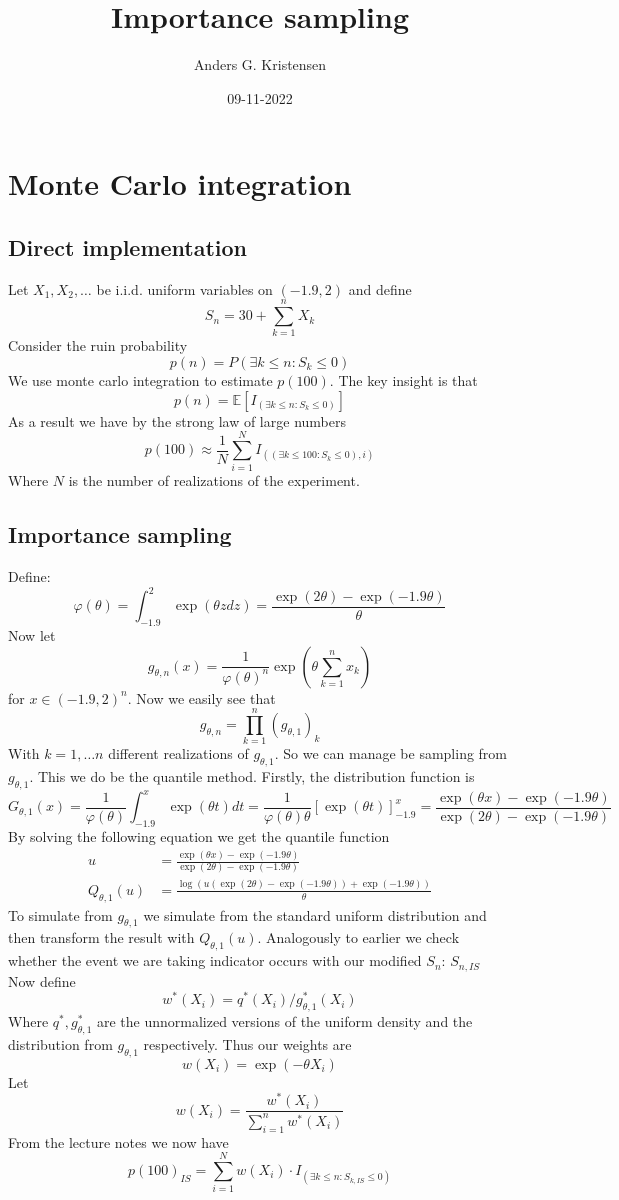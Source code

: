 \documentclass[a4paper, 11 pt]{article}
\title{Importance sampling}
\author{Anders G. Kristensen}
\date{09-11-2022}
\begin{document}
\maketitle
\section{Monte Carlo integration}
\subsection{Direct implementation}
\noindent Let $X_1,X_2,\dots$ be i.i.d. uniform variables on $(-1.9, 2)$ and define
\[
    S_n = 30 + \sum_{k = 1}^n X_k
\]
Consider the ruin probability
\[
    p(n) = P(\exists k\leq n : S_k \leq 0)
\]
We use monte carlo integration to estimate $p(100)$. The key insight is that
\[
    p(n) = \mathbb{E}\left[I_{\left(\exists k\leq n : S_k\leq 0\right)}\right]    
\]
As a result we have by the strong law of large numbers
\[
    p(100) \approx \frac{1}{N}\sum_{i = 1}^N I_{\left(\left(\exists k\leq 100 : S_k\leq 0\right),i\right)}
\]
Where $N$ is the number of realizations of the experiment.
\subsection{Importance sampling}
Define:
\[
\varphi(\theta) = \int_{-1.9}^2 \exp\left(\theta z dz\right) = \frac{\exp\left(2\theta\right)-\exp\left(-1.9\theta\right)}{\theta}    
\]
Now let 
\[
    g_{\theta, n}(x) = \frac{1}{\varphi(\theta)^n}\exp{\left(\theta \sum_{k = 1}^n x_k\right)}  
\]
for $x\in(-1.9,2)^n$. Now we easily see that 
\[
    g_{\theta, n} = \prod_{k = 1}^n\left(g_{\theta, 1}\right)_k
\]
With $k = 1,\dots n$ different realizations of $g_{\theta,1}$. So we can manage be sampling from $g_{\theta,1}$. This we do be the quantile method. Firstly, the distribution function is
\[
    G_{\theta,1}(x) = \frac{1}{\varphi(\theta)}\int_{-1.9}^x \exp\left(\theta t\right)dt = \frac{1}{\varphi(\theta)\theta}\left[\exp(\theta t)\right]_{-1.9}^x = \frac{\exp(\theta x)-\exp(-1.9\theta)}{\exp(2\theta)-\exp(-1.9\theta)}
\]
By solving the following equation we get the quantile function
\begin{align*}
    u &= \frac{\exp\left(\theta x\right)-\exp(-1.9\theta)}{\exp(2\theta)-\exp(-1.9\theta)} \\
    Q_{\theta,1}(u) &= \frac{\log\left(u\left(\exp(2\theta)-\exp(-1.9\theta)\right)+\exp(-1.9\theta)\right)}{\theta}
\end{align*}
To simulate from $g_{\theta,1}$ we simulate from the standard uniform distribution and then transform the result with $Q_{\theta,1}(u)$. Analogously to earlier we check whether the event we are taking indicator occurs with our modified $S_n$: $S_{n,IS}$ Now define 
\[
    w^*(X_i) = q^*(X_i)/g_{\theta,1}^*(X_i)    
\]
Where $q^*, g_{\theta,1}^*$ are the unnormalized versions of the uniform density and the distribution from $g_{\theta,1}$ respectively. Thus our weights are
\[
    w(X_i) = \exp\left(-\theta X_i\right)    
\]
Let
\[
w(X_i) = \frac{w^*(X_i)}{\sum_{i = 1}^n w^*(X_i)}  
\]
From the lecture notes we now have 
\[
p(100)_{IS} = \sum_{i = 1}^N w(X_i)\cdot I_{\left(\exists k\leq n :S_{k,IS}\leq 0\right)}
\]
\end{document}
